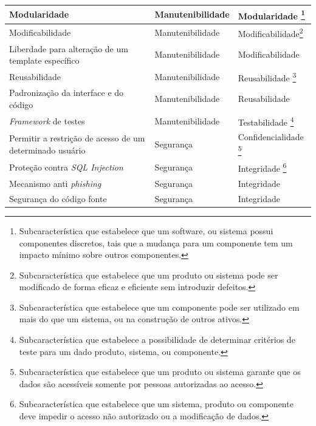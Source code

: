 \begin{longtable}{|p{140pt}|p{140pt}|p{120pt}|}
 	{\raggedright Modularidade}
 	 	 	 & {\raggedright Manutenibilidade}
 	 	 	 & {\raggedright Modularidade \footnote{Subcaracterística que estabelece que um software, ou sistema possui componentes discretos, tais que a mudança para um componente tem um impacto mínimo sobre outros componentes.}}\\
 	 	 	\hline
	{\raggedright Modificabilidade}
 	 	 	 & {\raggedright Manutenibilidade}
 	 	 	 & {\raggedright Modificabilidade\footnote{Subcaracterística que estabelece que um produto ou sistema pode ser modificado de forma eficaz e eficiente sem introduzir defeitos.}}\\
 	 	 	\hline
	{\raggedright Liberdade para alteração de um template específico}
 	 	 	 & {\raggedright Manutenibilidade}
 	 	 	 & {\raggedright Modificabilidade}\\
 	 	 	\hline
	{\raggedright Reusabilidade}
 	 	 	 & {\raggedright Manutenibilidade}
 	 	 	 & {\raggedright Reusabilidade \footnote{Subcaracterística que estabelece que um componente pode ser utilizado em mais do que um sistema, ou na construção de outros ativos.}}\\
 	 	 	\hline
	{\raggedright Padronização da interface e do código}
 	 	 	 & {\raggedright Manutenibilidade}
 	 	 	 & {\raggedright Reusabilidade}\\
 	 	 	\hline
	{\raggedright \textit{Framework} de testes}
 	 	 	 & {\raggedright Manutenibilidade}
 	 	 	 & {\raggedright Testabilidade \footnote{ Subcaracterística que estabelece a possibilidade de determinar critérios de teste para um dado produto, sistema, ou componente.}}\\
 	 	 	\hline
{\raggedright Permitir a restrição de acesso de um determinado usuário}
 	 & {\raggedright Segurança}
 	 & {\raggedright Confidencialidade \footnote{ Subcaracterística que estabelece que um produto ou sistema garante que os dados são acessíveis somente por pessoas autorizadas ao acesso.}}\\
 	\hline
 	 {\raggedright Proteção contra \textit{SQL Injection}}
 	 & {\raggedright Segurança}
 	 & {\raggedright Integridade \footnote{Subcaracterística que estabelece que um sistema, produto ou componente deve impedir o acesso não autorizado ou a modificação de dados.}}\\
 	\hline
 {\raggedright Mecanismo anti \textit{phishing}}
 	 & {\raggedright Segurança}
 	 & {\raggedright Integridade}\\
 	\hline
 	 {\raggedright Segurança do código fonte}
 	 & {\raggedright Segurança}
 	 & {\raggedright Integridade}\\\hline


\end{longtable}
